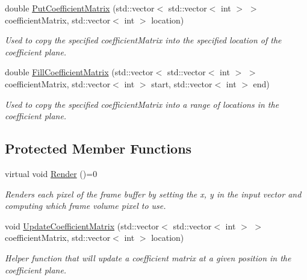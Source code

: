 \begin{DoxyCompactItemize}
double \hyperlink{classnddi_1_1_base_nddi_display_acd6e5f8767c04dbcd1c3006eb6af3685}{PutCoefficientMatrix} (std::vector$<$ std::vector$<$ int $>$ $>$ coefficientMatrix, std::vector$<$ int $>$ location)
\begin{DoxyCompactList}\small\item\em Used to copy the specified coefficientMatrix into the specified location of the coefficient plane. \item\end{DoxyCompactList}\item 
double \hyperlink{classnddi_1_1_base_nddi_display_aca8202a5a0af0d88e1fece2172a0cd0f}{FillCoefficientMatrix} (std::vector$<$ std::vector$<$ int $>$ $>$ coefficientMatrix, std::vector$<$ int $>$ start, std::vector$<$ int $>$ end)
\begin{DoxyCompactList}\small\item\em Used to copy the specified coefficientMatrix into a range of locations in the coefficient plane. \item\end{DoxyCompactList}\end{DoxyCompactItemize}
\subsection*{Protected Member Functions}
\begin{DoxyCompactItemize}
\item 
virtual void \hyperlink{classnddi_1_1_base_nddi_display_a63a6029aa172d733c4c39ebf0268d968}{Render} ()=0
\begin{DoxyCompactList}\small\item\em Renders each pixel of the frame buffer by setting the x, y in the input vector and computing which frame volume pixel to use. \item\end{DoxyCompactList}\item 
void \hyperlink{classnddi_1_1_base_nddi_display_a327145e412aad872f0f0b3d0cef790d4}{UpdateCoefficientMatrix} (std::vector$<$ std::vector$<$ int $>$ $>$ coefficientMatrix, std::vector$<$ int $>$ location)
\begin{DoxyCompactList}\small\item\em Helper function that will update a coefficient matrix at a given position in the coefficient plane. \item\end{DoxyCompactList}\end{DoxyCompactItemize}
